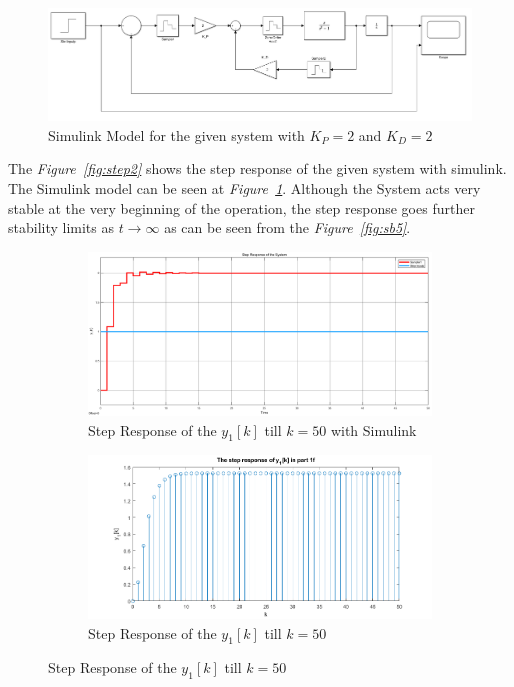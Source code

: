 \documentclass[a4paper,12pt]{article}
\begin{document}
\begin{enumerate}
\begin{enumerate}
	 	
		 
		\begin{figure}[H]
			\center
			\setlength{\unitlength}{\textwidth} 
			\includegraphics[width=1.0\unitlength]{images/simu2}
			\caption{\label{fig:simu2} Simulink Model for the given system with $K_P=2$ and $K_D=2$}
		\end{figure}
		
		The \textit{Figure~\ref{fig:step2}} shows the step response of the given system  with simulink. The Simulink model can be seen at \textit{Figure~\ref{fig:simu2}}. Although the System acts very stable at the very beginning of the operation, the step response goes further stability limits as $t \to \infty $ as can be seen from the \textit{Figure~\ref{fig:sb5}}. 
		
		\begin{figure}[H]
			\setlength{\unitlength}{\textwidth} 
			\centering
			\begin{subfigure}{.5\textwidth}
				\centering
				\includegraphics[width=0.48\unitlength]{images/1g}
				\caption{\label{fig:sb1} Step Response of the $y_1[k]$ till $k=50$ with Simulink }
			\end{subfigure}%
			\begin{subfigure}{.5\textwidth}
				\centering
				\includegraphics[width=0.48\unitlength]{images/1fa}
				\caption{\label{fig:sb2} Step Response of the $y_1[k]$ till $k=50$ }
			\end{subfigure}
		\end{figure}
		

\end{enumerate}
\end{enumerate}
\end{document}

